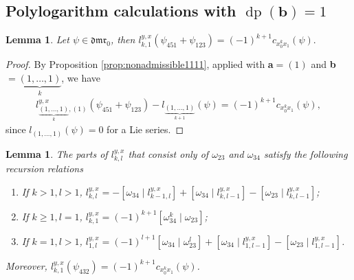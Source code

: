 \documentclass[a4paper,fleqn]{cas-sc}
\newtheorem{lemma}[theorem]{Lemma}
\DeclareMathOperator{\dpt}{dp}
\begin{document}
\subsection{Polylogarithm calculations with $\dpt({\textbf{b}})=1$}


\begin{lemma}\label{lemma:451123_1}
Let $\psi\in \mathfrak{dmr}_0$, then
$
l^{y,x}_{k,1}(\psi_{451}+\psi_{123})=(-1)^{k+1}c_{x^k_0x_1}(\psi).
$
\end{lemma}

\begin{proof}
By Proposition \ref{prop:nonadmissible1111}, applied with \textbf{a}$=(1)$ and \textbf{b}$=\underbrace{(1, \ldots, 1)}_k$, we have
\begin{align*}
   l^{y,x}_{\underbrace{(1,\dots,1)}_{k},(1)}(\psi_{451}+\psi_{123})-l_{ \underbrace{(1,\dots,1)}_{k+1}}(\psi)=(-1)^{k+1}c_{x^k_0x_1}(\psi), 
\end{align*}
since $l_{(1, \ldots, 1)}(\psi)=0$ for a Lie series.
\end{proof}

\begin{lemma}\label{lemma:432_1}
The parts of $l^{y,x}_{k,l}$ that consist only of $\omega_{23}$ and $\omega_{34}$ satisfy the following recursion relations
	\begin{enumerate}
		\item \label{item:formula1} If $k>1,l>1$, $l^{y,x}_{k,l}=-[\omega_{34}\mid l^{y,x}_{k-1,l}]+[\omega_{34}\mid l^{y,x}_{k,l-1}]-[\omega_{23}\mid l^{y,x}_{k,l-1}]$;
        
		\item \label{item:formula2}
        If $k\ge 1,l=1$, $l^{y,x}_{k,1}=(-1)^{k+1}[\omega^k_{34}\mid \omega_{23}]$;
        
		\item If $k=1,l>1$, $l^{y,x}_{1,l}=(-1)^{l+1}[\omega_{34}\mid \omega^l_{23}]+[\omega_{34}\mid l^{y,x}_{1,l-1}]-[\omega_{23}\mid l^{y,x}_{1,l-1}]$.
	\end{enumerate}
    Moreover, $l^{y,x}_{k,1}(\psi_{432})=(-1)^{k+1}c_{x^k_0 x_1}(\psi)$.
\end{lemma}
\end{document}

